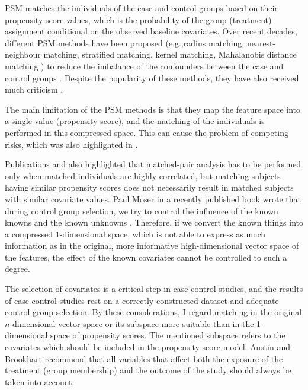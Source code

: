 PSM matches the individuals of the case and control groups based on their propensity score values, which is the probability of the group (treatment) assignment conditional on the observed baseline covariates. Over recent decades, different PSM methods have been proposed (e.g.,radius matching, nearest-neighbour matching, stratified matching, kernel matching, Mahalanobis distance matching \cite{baser2006too, austin2011introduction, caliendo2008some}) to reduce the imbalance of the confounders between the case and control groups \cite{stuart2010matching}. Despite the popularity of these methods, they have also received much criticism \cite{biondi2011propensity, pearl2009remarks, mansournia2018case}.


The main limitation of the PSM methods is that they map the feature space into a single value (propensity score), and the matching of the individuals is performed in this compressed space. This can cause the problem of competing risks, which was also highlighted in \cite{he2021optimal}.

Publications \cite{stuart2010matching} and \cite{wan2019matched} also highlighted that matched-pair analysis has to be performed only when matched individuals are highly correlated, but matching subjects having similar propensity scores does not necessarily result in matched subjects with similar covariate values. Paul Moser in a recently published book wrote that during control group selection, we try to control the influence of the known knowns and the known unknowns \cite{moser2019out}. Therefore, if we convert the known things into a compressed 1-dimensional space, which is not able to express as much information as in the original, more informative high-dimensional vector space of the features, the effect of the known covariates cannot be controlled to such a degree.

The selection of covariates is a critical step in case-control studies, and the results of case-control studies rest on a correctly constructed dataset and adequate control group selection. By these considerations, I regard matching in the original $n$-dimensional vector space or its subspace more suitable than in the 1-dimensional space of propensity scores. The mentioned subspace refers to the covariates which should be included in the propensity score model. Austin \cite{austin2007comparison} and Brookhart \cite{brookhart2006variable} recommend that all variables that affect both the exposure of the treatment (group membership) and the outcome of the study should always be taken into account.

